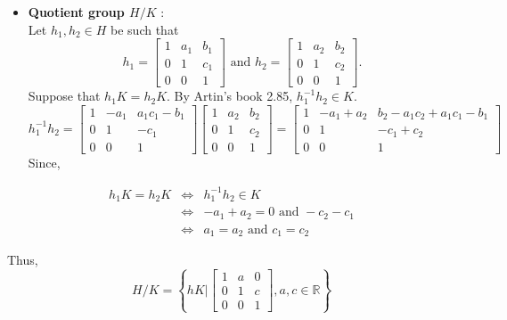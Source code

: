 \documentclass[
]{book}
\providecommand{\tightlist}{%
  \setlength{\itemsep}{0pt}\setlength{\parskip}{0pt}}
\begin{document}
\begin{itemize}
\tightlist
\item
  \textbf{Quotient group \(H/K\)} :\\
  Let \(h_1,h_2\in H\) be such that
  \[h_1=\begin{bmatrix} 1 & a_1 & b_1 \\0 & 1 & c_1\\ 0 & 0  & 1\end{bmatrix} \text{ and } 
  h_2=\begin{bmatrix} 1 & a_2 & b_2 \\0 & 1 & c_2\\ 0 & 0  & 1\end{bmatrix}.\]
  Suppose that \(h_1K=h_2K\). By Artin's book 2.85,
  \(h_1^{-1}h_2\in K\). \[h_1^{-1}h_2=
  \begin{bmatrix} 1 & -a_1 & a_1c_1-b_1 \\0 & 1 & -c_1\\ 0 & 0  & 1\end{bmatrix}
  \begin{bmatrix} 1 & a_2 & b_2 \\0 & 1 & c_2\\ 0 & 0  & 1\end{bmatrix}
  =\begin{bmatrix} 1 & -a_1+a_2 & b_2-a_1c_2+a_1c_1-b_1 \\0 & 1 & -c_1+c_2\\ 0 & 0  & 1\end{bmatrix}\]
  Since,
\end{itemize}

\begin{eqnarray}
h_1K=h_2K & \iff & h_1^{-1}h_2\in K\\
& \iff &  -a_1+a_2=0 \text{ and }-c_2-c_1\\
& \iff &  a_1=a_2\text{ and }c_1=c_2
\end{eqnarray}

Thus,
\[H/K=\left\{hK\Biggr | \begin{bmatrix} 1 & a & 0 \\0 & 1 & c\\ 0 & 0  & 1\end{bmatrix}, a,c\in \mathbb{R}\right\}\]
\end{document}
